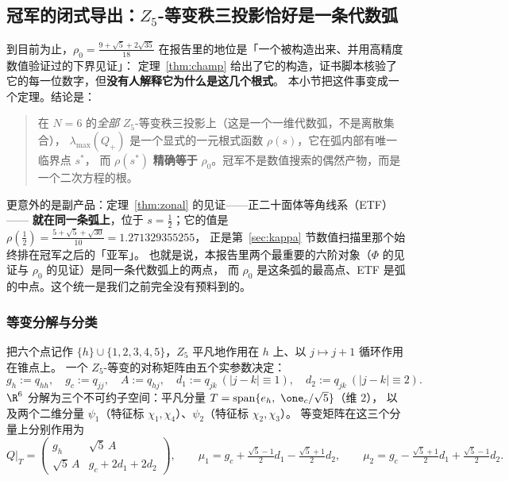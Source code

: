 \subsection{冠军的闭式导出：$Z_5$-等变秩三投影恰好是一条代数弧}\label{sec:conefamily}

到目前为止，$\rho_0=\frac{9+\sqrt5+2\sqrt{35}}{18}$ 在报告里的地位是「一个被构造出来、并用高精度数值验证过的下界见证」：
定理~\ref{thm:champ} 给出了它的构造，证书脚本核验了它的每一位数字，但\textbf{没有人解释它为什么是这几个根式}。
本小节把这件事变成一个定理。结论是：

\begin{quote}\small
在 $N=6$ 的\emph{全部} $Z_5$-等变秩三投影上（这是一个一维代数弧，不是离散集合），
$\lambda_{\max}(Q_+)$ 是一个显式的一元根式函数 $\rho(s)$，它在弧内部有唯一临界点 $s^*$，
而 $\rho(s^*)$ \textbf{精确等于} $\rho_0$。冠军不是数值搜索的偶然产物，而是一个二次方程的根。
\end{quote}

更意外的是副产品：定理~\ref{thm:zonal} 的见证——正二十面体等角线系（ETF）——
\textbf{就在同一条弧上}，位于 $s=\frac12$；它的值是 $\rho(\frac12)=\frac{5+\sqrt5+\sqrt{30}}{10}=1.271329355255$，
正是第~\ref{sec:kappa} 节数值扫描里那个始终排在冠军之后的「亚军」。
也就是说，本报告里两个最重要的六阶对象（$\Phi$ 的见证与 $\rho_0$ 的见证）是同一条代数弧上的两点，
而 $\rho_0$ 是这条弧的最高点、ETF 是弧的中点。这个统一是我们之前完全没有预料到的。

\subsubsection*{等变分解与分类}

把六个点记作 $\{h\}\cup\{1,2,3,4,5\}$，$Z_5$ 平凡地作用在 $h$ 上、以 $j\mapsto j+1$ 循环作用在锥点上。
一个 $Z_5$-等变的对称矩阵由五个实参数决定：
\[
g_h:=q_{hh},\quad g_c:=q_{jj},\quad A:=q_{hj},\quad d_1:=q_{jk}\ (|j-k|\equiv1),\quad
d_2:=q_{jk}\ (|j-k|\equiv2).
\]
$\R^6$ 分解为三个不可约子空间：平凡分量 $T=\mathrm{span}\{e_h,\ \one_c/\sqrt5\}$（维 $2$），
以及两个二维分量 $\psi_1$（特征标 $\chi_1,\chi_4$）、$\psi_2$（特征标 $\chi_2,\chi_3$）。
等变矩阵在这三个分量上分别作用为
\begin{equation}\label{eq:isoT}
Q\big|_T=\begin{pmatrix} g_h & \sqrt5\,A\\[2pt] \sqrt5\,A & g_c+2d_1+2d_2\end{pmatrix},\qquad
\mu_1=g_c+\tfrac{\sqrt5-1}2d_1-\tfrac{\sqrt5+1}2d_2,\qquad
\mu_2=g_c-\tfrac{\sqrt5+1}2d_1+\tfrac{\sqrt5-1}2d_2 .
\end{equation}

